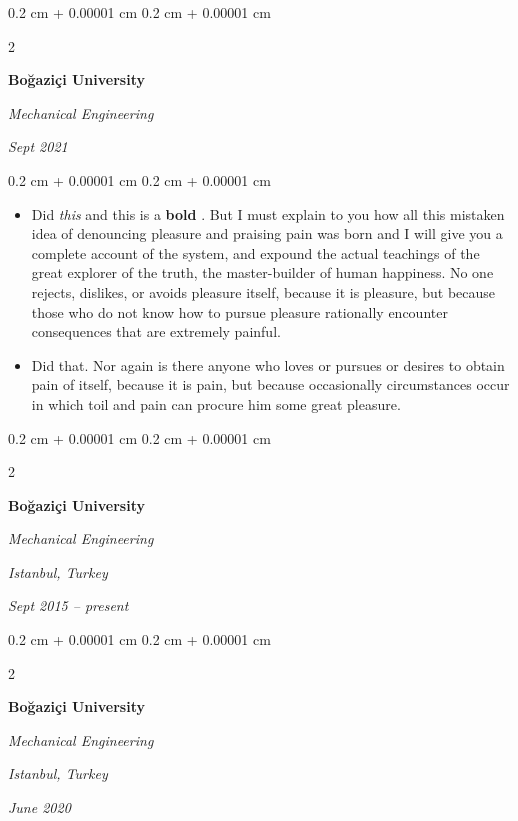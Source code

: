\documentclass[10pt, letterpaper]{article}
\newenvironment{highlights}{
    \begin{itemize}[
        topsep=0.10 cm,
        parsep=0.10 cm,
        partopsep=0pt,
        itemsep=0pt,
        leftmargin=0.4 cm + 10pt
    ]
}{
    \end{itemize}
} %
\newenvironment{onecolentry}{
    \begin{adjustwidth}{
        0.2 cm + 0.00001 cm
    }{
        0.2 cm + 0.00001 cm
    }
}{
    \end{adjustwidth}
} %
\newenvironment{twocolentry}[2][]{
    \onecolentry
    \def\secondColumn{#2}
    \setcolumnwidth{\fill, 4.5 cm}
    \begin{paracol}{2}
}{
    \switchcolumn \raggedleft \secondColumn
    \end{paracol}
    \endonecolentry
} %
\let\hrefWithoutArrow\href
\renewcommand{\href}[2]{\hrefWithoutArrow{#1}{\ifthenelse{\equal{#2}{}}{ }{#2 }\raisebox{.15ex}{\footnotesize \faExternalLink*}}}
\begin{document}
        \begin{twocolentry}{
            
            
        \textit{Sept 2021}}
            \textbf{Boğaziçi University}

            \textit{Mechanical Engineering}
        \end{twocolentry}
        \vspace{0.10 cm}
        \begin{onecolentry}
            \begin{highlights}
                \item Did \textit{this} and this is a \textbf{bold} \href{https://example.com}{link}. But I must explain to you how all this mistaken idea of denouncing pleasure and praising pain was born and I will give you a complete account of the system, and expound the actual teachings of the great explorer of the truth, the master-builder of human happiness. No one rejects, dislikes, or avoids pleasure itself, because it is pleasure, but because those who do not know how to pursue pleasure rationally encounter consequences that are extremely painful.
                \item Did that. Nor again is there anyone who loves or pursues or desires to obtain pain of itself, because it is pain, but because occasionally circumstances occur in which toil and pain can procure him some great pleasure.
            \end{highlights}
        \end{onecolentry}


        \vspace{0.2 cm}

        \begin{twocolentry}{
        \textit{Istanbul, Turkey}    
            
        \textit{Sept 2015 – present}}
            \textbf{Boğaziçi University}

            \textit{Mechanical Engineering}
        \end{twocolentry}


        \vspace{0.2 cm}

        \begin{twocolentry}{
        \textit{Istanbul, Turkey}    
            
        \textit{June 2020}}
            \textbf{Boğaziçi University}

            \textit{Mechanical Engineering}
        \end{twocolentry}
\end{document}
